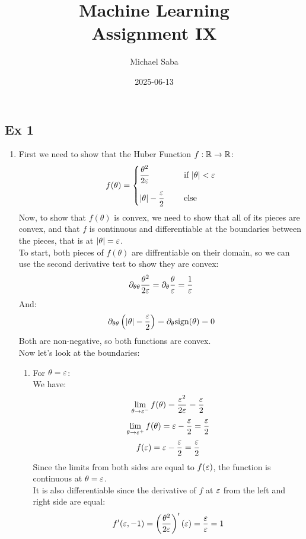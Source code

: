 \documentclass[12pt]{article}
\title{
    \Huge Machine Learning \\
    \Large Assignment IX
}
\date{2025-06-13}
\author{Michael Saba}
\begin{document}
\maketitle
\newpage
\setlength{\parindent}{0pt}

\subsection*{Ex 1}

\begin{enumerate}[label = \letters]
    \item 
    First we need to show that the Huber Function
    $f: \mathbb{R} \to \mathbb{R}$:
    \[ f(\theta) = \piecewise{
        \dfrac{\theta^2}{2\eps} \quad & \IF 
        |\theta| < \eps \vs{10} \\ 
        |\theta| - \dfrac{\eps}{2} \quad & \ELSE
    } \]
    Now, to show that $f(\theta)$
    is convex, we need to show that all of its
    pieces are convex, and that $f$ is continuous
    and differentiable at the boundaries
    between the pieces, that is at $|\theta| = \varepsilon$. \\
    To start, both pieces of $f(\theta)$
    are diffrentiable on their domain,
    so we can use the second derivative test
    to show they are convex:
    \[ \partial_{\theta \theta} \dfrac{\theta^2}{2\varepsilon}
    = \partial_{\theta} \dfrac{\theta}{\varepsilon} 
    = \dfrac{1}{\varepsilon} \]
    And:
    \[ \partial_{\theta \theta} \left(  |\theta| 
    - \dfrac{\varepsilon}{2} \right)
    = \partial_{\theta} \text{sign}(\theta) = 0 \]
    Both are non-negative, so both functions are convex. \\
    Now let's look at the boundaries:
    \begin{enumerate}[label = \numbers]
        \item For $\theta = \varepsilon$: \\
        We have:
        \[ \lim_{\theta \to \varepsilon^-} f(\theta)
        = \dfrac{\varepsilon^2}{2\varepsilon} = \dfrac{\varepsilon}{2} \]
        \[ \lim_{\theta \to \varepsilon^+} f(\theta)
        = \varepsilon - \dfrac{\varepsilon}{2} = \dfrac{\varepsilon}{2} \]
        \[ f(\varepsilon) = \varepsilon - \dfrac{\varepsilon}{2} 
        = \dfrac{\varepsilon}{2} \]
        Since the limits from both sides are equal
        to $f(\varepsilon)$, the function is continuous
        at $\theta = \varepsilon$. \\
        It is also differentiable since the
        derivative of $f$ at $\varepsilon$ 
        from the left and right side are equal:
        \[ f'(\varepsilon, -1) = 
        \left( \dfrac{\theta^2}{2\varepsilon} \right)'(\varepsilon)
        = \dfrac{\varepsilon}{\varepsilon} = 1 \] 

\end{enumerate}
\end{enumerate}
\end{document}
